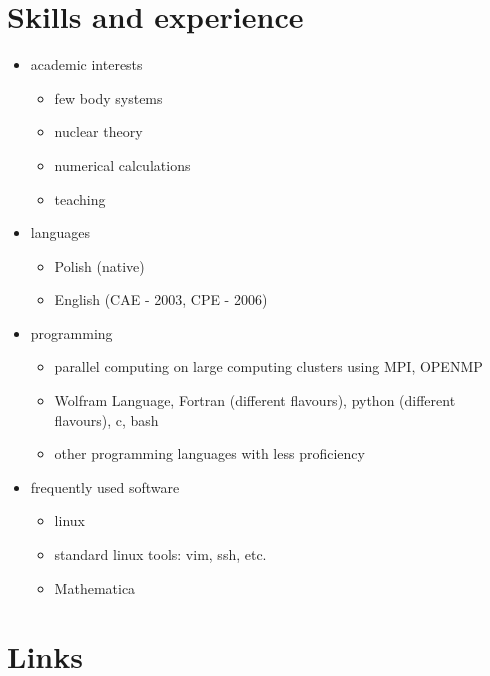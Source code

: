 \documentclass{article}
\providecommand{\tightlist}{%
  \setlength{\itemsep}{0pt}\setlength{\parskip}{0pt}}
\begin{document}
\hypertarget{skills-and-experience}{%
\section{Skills and experience}\label{skills-and-experience}}

\begin{itemize}
\tightlist
\item
  academic interests

  \begin{itemize}
  \tightlist
  \item
    few body systems
  \item
    nuclear theory
  \item
    numerical calculations
  \item
    teaching
  \end{itemize}
\item
  languages

  \begin{itemize}
  \tightlist
  \item
    Polish (native)
  \item
    English (CAE - 2003, CPE - 2006)
  \end{itemize}
\item
  programming

  \begin{itemize}
  \tightlist
  \item
    parallel computing on large computing clusters using MPI, OPENMP
  \item
    Wolfram Language, Fortran (different flavours), python (different
    flavours), c, bash
  \item
    other programming languages with less proficiency
  \end{itemize}
\item
  frequently used software

  \begin{itemize}
  \tightlist
  \item
    linux
  \item
    standard linux tools: vim, ssh, etc.
  \item
    Mathematica
  \end{itemize}
\end{itemize}

\hypertarget{links}{%
\section{Links}\label{links}}
\end{document}
